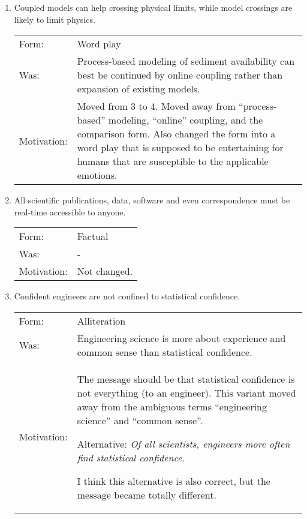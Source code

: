 \documentclass[headinclude,footinclude,cleardoublepage=empty,
numbers=noenddot,fontsize=9pt]{scrbook}
\begin{document}
\begin{enumerate}
\item Coupled models can help crossing physical limits, while model
  crossings are likely to limit physics.

  \begin{tabular}{l p{8cm}}
    Form:       & Word play \\
    Was:        & Process-based modeling of sediment availability can
                  best be continued by online coupling rather than expansion of
                  existing models. \\
    Motivation: &  Moved from 3 to 4. Moved away from ``process-based'' modeling,
                  ``online'' coupling, and the comparison form. Also changed the
                  form into a word play that is supposed to be entertaining for
                  humans that are susceptible to the applicable emotions. \\
  \end{tabular}

\item All scientific publications, data, software and even
  correspondence must be real-time accessible to anyone.

  \begin{tabular}{l p{8cm}}
    Form:       & Factual \\
    Was:        & - \\
    Motivation: & Not changed. \\
  \end{tabular}

\item Confident engineers are not confined to statistical
  confidence.

  \begin{tabular}{l p{8cm}}
    Form:       & Alliteration \\
    Was:        & Engineering science is more about experience and common
                  sense than statistical confidence. \\
    Motivation: & The message should be that statistical confidence is not
                  everything (to an engineer). This variant moved away from the
                  ambiguous terms ``engineering science'' and ``common
                  sense''.

                  Alternative: \emph{Of all scientists, engineers more often find
                  statistical confidence}.

                  I think this alternative is also correct, but the message became
                  totally different. \\
  \end{tabular}


\end{enumerate}
\end{document}
